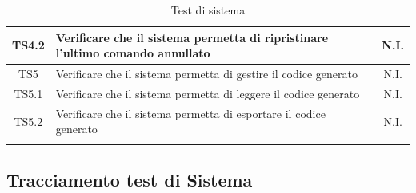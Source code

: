 \documentclass[../PianoDiQualifica.tex]{subfiles}
\begin{document}
\begin{longtable}{|c|>{\centering}p{10cm}|c|}
	\hline
	TS4.2 & Verificare che il sistema permetta di ripristinare l'ultimo comando annullato & N.I. \\
	\hline
	TS5 & Verificare che il sistema permetta di gestire il codice generato & N.I. \\
	\hline
	TS5.1 & Verificare che il sistema permetta di leggere il codice generato & N.I. \\
	\hline
	TS5.2 & Verificare che il sistema permetta di esportare il codice generato & N.I. \\
	\hline
\caption[Test di sistema]{Test di sistema}
\label{tabella:TestSistema}
\end{longtable}

\subsection{Tracciamento test di Sistema}
	\normalsize
\end{document}
